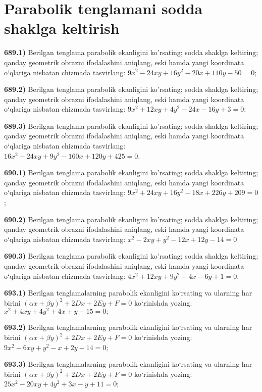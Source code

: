 \section{Parabolik tenglamani sodda shaklga keltirish}



\textbf{689.1)} Berilgan tenglama parabolik ekanligini ko'rsating; sodda shaklga keltiring; qanday geometrik obrazni ifodalashini aniqlang, eski hamda yangi koordinata o‘qlariga nisbatan chizmada tasvirlang: $9 x^2-24 x y+16 y^2-20 x+110 y-50=0$;

\textbf{689.2)} Berilgan tenglama parabolik ekanligini ko'rsating; sodda shaklga keltiring; qanday geometrik obrazni ifodalashini aniqlang, eski hamda yangi koordinata o‘qlariga nisbatan chizmada tasvirlang: $9 x^2+12 x y+4 y^2-24 x-16 y+3=0$;

\textbf{689.3)} Berilgan tenglama parabolik ekanligini ko'rsating; sodda shaklga keltiring; qanday geometrik obrazni ifodalashini aniqlang, eski hamda yangi koordinata o‘qlariga nisbatan chizmada tasvirlang: $16 x^2-24 x y+9 y^2-160 x+120 y+425=0$.

\textbf{690.1)} Berilgan tenglama parabolik ekanligini ko'rsating; sodda shaklga keltiring; qanday geometrik obrazni ifodalashini aniqlang, eski hamda yangi koordinata o‘qlariga nisbatan chizmada tasvirlang: $9 x^2+24 x y+16 y^2-18 x+226 y+209=0$;

\textbf{690.2)} Berilgan tenglama parabolik ekanligini ko'rsating; sodda shaklga keltiring; qanday geometrik obrazni ifodalashini aniqlang, eski hamda yangi koordinata o‘qlariga nisbatan chizmada tasvirlang: $x^2-2 x y+y^2-12 x+12 y-14=0$

\textbf{690.3)} Berilgan tenglama parabolik ekanligini ko'rsating; sodda shaklga keltiring; qanday geometrik obrazni ifodalashini aniqlang, eski hamda yangi koordinata o‘qlariga nisbatan chizmada tasvirlang: $4 x^2+12 x y+9 y^2-4 x-6 y+1=0$.

\textbf{693.1)} Berilgan tenglamalarning parabolik ekanligini ko‘rsating va ularning har birini $(\alpha x+\beta y)^2+2 D x+2 E y+F=0$ ko‘rinishda yozing: $x^2+4 x y+4 y^2+4 x+y-15=0 ;$

\textbf{693.2)} Berilgan tenglamalarning parabolik ekanligini ko‘rsating va ularning har birini $(\alpha x+\beta y)^2+2 D x+2 E y+F=0$ ko‘rinishda yozing: $9 x^2-6 x y+y^2-x+2 y-14=0$;

\textbf{693.3)} Berilgan tenglamalarning parabolik ekanligini ko‘rsating va ularning har birini $(\alpha x+\beta y)^2+2 D x+2 E y+F=0$ ko‘rinishda yozing: $25 x^2-20 x y+4 y^2+3 x-y+11=0$;

